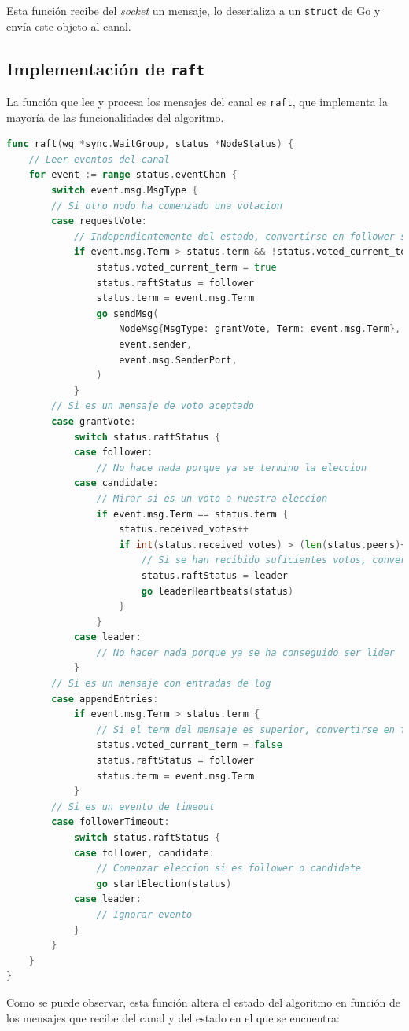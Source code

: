 Esta función recibe del \textit{socket} un mensaje, lo deserializa a un \texttt{struct} de Go \cite{gostructs} y envía este objeto al canal.

\subsection{Implementación de \texttt{raft}}

La función que lee y procesa los mensajes del canal es \texttt{raft}, que implementa la mayoría de las funcionalidades del algoritmo.

\begin{lstlisting}[language=go]
func raft(wg *sync.WaitGroup, status *NodeStatus) {
	// Leer eventos del canal
	for event := range status.eventChan {
		switch event.msg.MsgType {
		// Si otro nodo ha comenzado una votacion		
		case requestVote:
			// Independientemente del estado, convertirse en follower si el term del mensaje es superior y si no se ha votado en el term actual
			if event.msg.Term > status.term && !status.voted_current_term {
				status.voted_current_term = true
				status.raftStatus = follower
				status.term = event.msg.Term
				go sendMsg(
					NodeMsg{MsgType: grantVote, Term: event.msg.Term},
					event.sender,
					event.msg.SenderPort,
				)
			}
		// Si es un mensaje de voto aceptado
		case grantVote:
			switch status.raftStatus {
			case follower:
				// No hace nada porque ya se termino la eleccion
			case candidate:
				// Mirar si es un voto a nuestra eleccion
				if event.msg.Term == status.term {
					status.received_votes++
					if int(status.received_votes) > (len(status.peers)+1)/2 {
						// Si se han recibido suficientes votos, convertirse en lider
						status.raftStatus = leader
						go leaderHeartbeats(status)
					}
				}
			case leader:
				// No hacer nada porque ya se ha conseguido ser lider
			}
		// Si es un mensaje con entradas de log
		case appendEntries:
			if event.msg.Term > status.term {
				// Si el term del mensaje es superior, convertirse en follower
				status.voted_current_term = false
				status.raftStatus = follower
				status.term = event.msg.Term
			}
		// Si es un evento de timeout
		case followerTimeout:
			switch status.raftStatus {
			case follower, candidate:
				// Comenzar eleccion si es follower o candidate
				go startElection(status)
			case leader:
				// Ignorar evento
			}
		}
	}
}
\end{lstlisting}

Como se puede observar, esta función altera el estado del algoritmo en función de los mensajes que recibe del canal y del estado en el que se encuentra:

